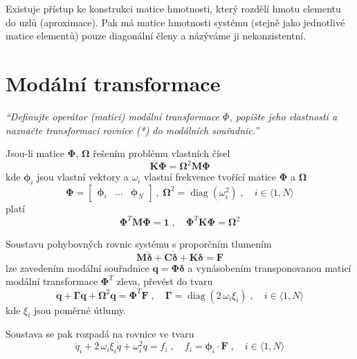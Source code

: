 \documentclass{article}
\begin{document}
\begin{multicols}{2}
	Existuje přístup ke konstrukci matice hmotnosti, který rozdělí hmotu elementu do uzlů (aproximace). Pak má matice hmotnosti systému (stejně jako jednotlivé matice elementů) pouze diagonální členy a názýváme ji nekonzistentní.

	

	\vfill\null
	\columnbreak


	\section{Modální transformace}
	\emph{``Definujte operátor (matici) modální transformace $\Phi$, popište jeho vlastnosti a naznačte transformaci rovnice (*) do modálních souřadnic.''}

	Jsou-li matice $\bm{\Phi}$, $\bm{\Omega}$ řešením problému vlastních čísel
	\begin{equation*}
		\bm{K}\bm{\Phi} = \bm{\Omega}^2 \bm{M} \bm{\Phi}
	\end{equation*}
	kde $\bm{\phi}_i$ jsou vlastní vektory a $\omega_i$ vlastní frekvence tvořící matice $\bm{\Phi}$ a $\bm{\Omega}$  
	\begin{equation*}
		\bm{\Phi} = \begin{bmatrix} \bm{\phi}_i & \dots & \bm{\phi}_N \end{bmatrix}
		\,,\;
		\bm{\Omega}^2 = \operatorname{diag}(\omega_i^2)
		\;,\quad 
		i \in \langle 1,N \rangle
	\end{equation*}
	platí
	\begin{equation*}
		\bm{\Phi}^T\bm{M}\bm{\Phi} = \bm{1}
		\;,\quad 
		\bm{\Phi}^T\bm{K}\bm{\Phi} = \bm{\Omega}^2
	\end{equation*}

	Soustavu pohybovných rovnic systému s proporčním tlumením
	\begin{equation*}
		\bm{M}\bm{\ddot{\delta}} + \bm{C}\bm{\dot{\delta}} + \bm{K}\bm{\delta} = \bm{F}
	\end{equation*}
	lze zavedením modální souřadnice $\bm{q} = \bm{\Phi}\bm{\delta}$ a vynásobením transponovanou maticí modální transformace $\bm{\Phi}^T$ zleva, převést do tvaru
	\begin{equation*}
		\bm{\ddot{q}} + \bm{\Gamma}\bm{\dot{q}} + \bm{\Omega}^2 \bm{q} = \bm{\Phi}^T \bm{F}
		\;,\quad 
		\bm{\Gamma} = \operatorname{diag}(2\,\omega_i\xi_i) \;,\quad i \in \langle 1,N \rangle
	\end{equation*}
	kde $\xi_i$ jsou poměrné útlumy.

	Soustava se pak rozpadá na rovnice ve tvaru
	\begin{equation*}
		\ddot{q}_i + 2\,\omega_i\xi_i \dot{q} + \omega_i^2 q = f_i
		\;,\quad 
		f_i = \bm{\phi}_i \cdot \bm{F}
		\;,\quad 
		i \in \langle 1,N \rangle
	\end{equation*}


\end{multicols}
\end{document}
